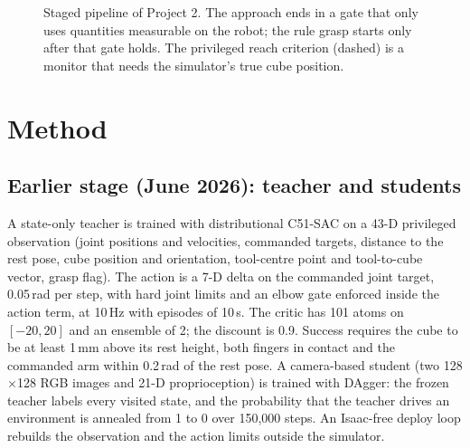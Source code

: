\documentclass[conference,10pt]{IEEEtran}
\begin{document}
\begin{figure}[t]
\centering
{}
\caption{Staged pipeline of Project 2. The approach ends in a gate that only uses quantities measurable on the robot;
the rule grasp starts only after that gate holds. The privileged reach criterion (dashed) is a monitor that needs the
simulator's true cube position.}
\label{fig:pipeline}
\end{figure}

\section{Method}\label{sec:method}
\subsection{Earlier stage (June 2026): teacher and students}
A state-only teacher is trained with distributional C51-SAC on a 43-D privileged observation (joint positions and
velocities, commanded targets, distance to the rest pose, cube position and orientation, tool-centre point and
tool-to-cube vector, grasp flag). The action is a 7-D delta on the commanded joint target, 0.05\,rad per step, with
hard joint limits and an elbow gate enforced inside the action term, at 10\,Hz with episodes of 10\,s. The critic has
101 atoms on $[-20, 20]$ and an ensemble of 2; the discount is 0.9. Success requires the cube to be at least 1\,mm
above its rest height, both fingers in contact and the commanded arm within 0.2\,rad of the rest pose.
A camera-based student (two 128$\times$128 RGB images and 21-D proprioception) is trained with DAgger: the frozen teacher
labels every visited state, and the probability that the teacher drives an environment is annealed from 1 to 0 over
150,000 steps. An Isaac-free deploy loop rebuilds the observation and the action limits outside the simulator.
\end{document}

